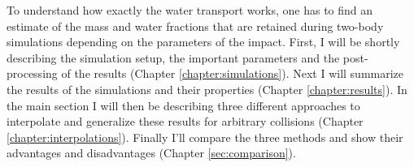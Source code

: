 
To understand how exactly the water transport works, one has to find an estimate of the mass and water fractions that are retained during two-body simulations depending on the parameters of the impact.
First, I will be shortly describing the simulation setup, the important parameters and the post-processing of the results (Chapter \ref{chapter:simulations}). Next I will summarize the results of the simulations and their properties (Chapter \ref{chapter:results}). In the main section I will then be describing three different approaches to interpolate and generalize these results for arbitrary collisions (Chapter \ref{chapter:interpolations}). Finally I'll compare the three methods and show their advantages and disadvantages (Chapter \ref{sec:comparison}).
